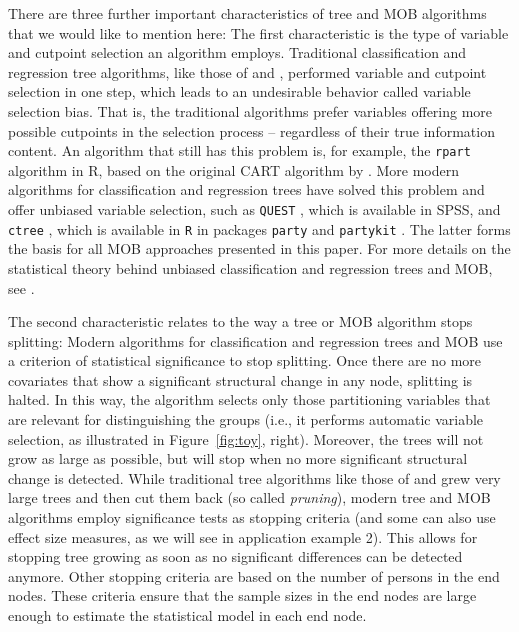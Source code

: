 \documentclass[doc,floatsintext,natbib]{apa7}
\begin{document}
There are three further important characteristics of tree and MOB algorithms that we would like to mention here: The first characteristic is the type of variable and cutpoint selection an algorithm employs. Traditional classification and regression tree algorithms, like those of \citet{Breetal:1984} and \citet{Qui:1993}, performed variable and cutpoint selection in one step, which leads to an undesirable behavior called variable selection bias. That is, the traditional algorithms prefer variables offering more possible cutpoints in the selection process -- regardless of their true information content. An algorithm that still has this problem is, for example, the \texttt{rpart} algorithm in R, based on the original CART algorithm by \citet{Breetal:1984}. More modern algorithms for classification and regression trees have solved this problem and offer unbiased variable selection, such as \texttt{QUEST} \citep{LohShi:1997}, which is available in SPSS, and \texttt{ctree} \citep{Hotetal:2006}, which is available in \texttt{R} in packages \texttt{party} and \texttt{partykit} \citep{partykit:pkg}. The latter forms the basis for all MOB approaches presented in this paper. For more details on the statistical theory behind unbiased classification and regression trees and MOB, see \citet{Hotetal:2006,StrMalTut:2009:PM,StroyKopf15}.  

The second characteristic relates to the way a tree or MOB algorithm stops splitting: Modern algorithms for classification and regression trees and MOB use a criterion of statistical significance to stop splitting. Once there are no more covariates that show a significant structural change in any node, splitting is halted. In this way, the  algorithm selects only those partitioning variables that are relevant for distinguishing the groups (i.e., it performs automatic variable selection, as illustrated in Figure~\ref{fig:toy}, right). Moreover, the trees will not grow as large as possible, but will stop when no more significant structural change is detected. While traditional tree algorithms like those of \citet{Breetal:1984} and \citet{Qui:1993} grew very large trees and then cut them back (so called \textit{pruning}), modern tree and MOB algorithms employ significance tests as stopping criteria (and some can also use effect size measures, as we will see in application example 2). This allows for stopping tree growing as soon as no significant differences can be detected anymore. Other stopping criteria are based on the number of persons in the end nodes. These criteria ensure that the sample sizes in the end nodes are large enough to estimate the statistical model in each end node.
\end{document}
